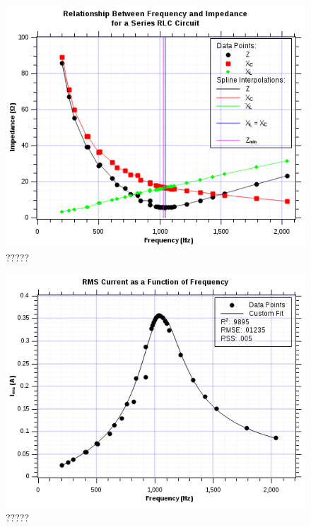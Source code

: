 \documentclass[twocolumn,english]{IEEEtran}
\theoremstyle{plain}
\theoremstyle{plain}
\begin{document}
\onecolumn
\begin{figure}[h!]
	\begin{centering}
	\begin{center}
	\includegraphics[width=\linewidth]{./Part2.png}
	\caption{?????}
	\label{fig:??????}
	\end{center}
	\par\end{centering}
\end{figure}
\begin{figure}[h!]
	\begin{centering}
	\begin{center}
	\includegraphics[width=\linewidth]{./Part3.png}
	\caption{?????}
	\label{fig:??????}
	\end{center}
	\par\end{centering}
\end{figure}
\end{document}
